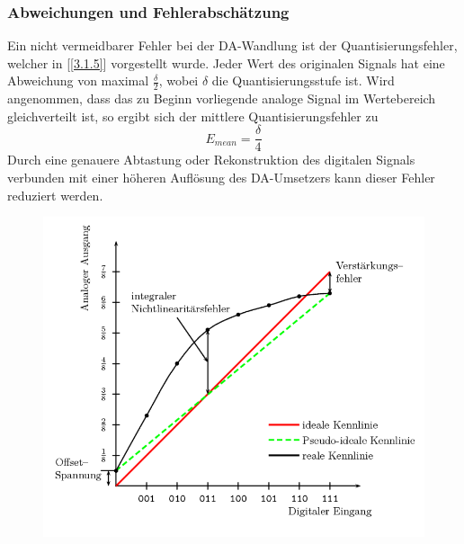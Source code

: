\subsubsection{Abweichungen und Fehlerabschätzung}
\label{4.1.3}
Ein nicht vermeidbarer Fehler bei der DA-Wandlung ist der Quantisierungsfehler, welcher in [\ref{3.1.5}] vorgestellt wurde. Jeder Wert des originalen Signals hat eine Abweichung von maximal $\frac{\delta}{2}$, wobei $\delta$ die Quantisierungsstufe ist. Wird angenommen, dass das zu Beginn vorliegende analoge Signal im Wertebereich gleichverteilt ist, so ergibt sich der mittlere Quantisierungsfehler zu $$E_{mean} = \frac{\delta}{4}$$
Durch eine genauere Abtastung oder Rekonstruktion des digitalen Signals verbunden mit einer höheren Auflösung des DA-Umsetzers kann dieser Fehler reduziert werden.\\

\begin{figure}[h!]
\centering
\includegraphics[scale=0.9]{images/dau_line.png}
\label{dau_line}
\end{figure}

